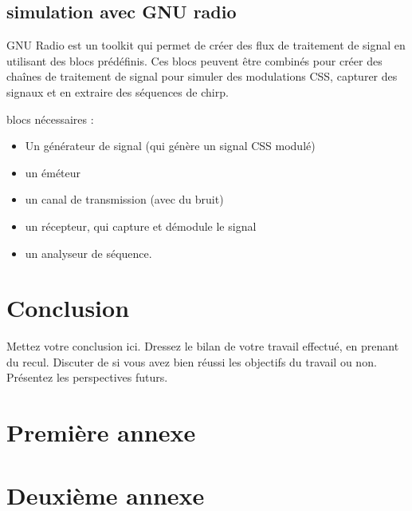 \documentclass[12pt,a4paper,oneside, titlepage]{report}
\begin{document}
\section{simulation avec GNU radio}

GNU Radio est un toolkit qui permet de créer des flux de traitement de signal en utilisant des blocs prédéfinis. Ces blocs peuvent être combinés pour créer des chaînes de traitement de signal pour simuler des modulations CSS, capturer des signaux et en extraire des séquences de chirp.


blocs nécessaires :
\begin{itemize}
\item Un générateur de signal (qui génère un signal CSS modulé)
\item un éméteur
\item un canal de transmission (avec du bruit)
\item un récepteur, qui capture et démodule le signal
\item un analyseur de séquence.
\end{itemize}

\chapter*{Conclusion}
\renewcommand{\leftmark}{CONCLUSION}

Mettez votre conclusion ici.  Dressez le bilan de votre travail effectué, en prenant du recul. Discuter de si vous avez bien réussi les objectifs du travail ou non. Présentez les perspectives futurs.






\newpage
\appendix
{}

\chapter{Premi\`ere annexe}
\renewcommand{\leftmark}{ANNEXE \thechapter.~~Premi\`ere annexe}
\label{annexe1}

\chapter{Deuxi\`eme annexe}
\renewcommand{\leftmark}{ANNEXE \thechapter.~~Deuxi\`eme annexe}
\label{annexe2}

\end{document}
